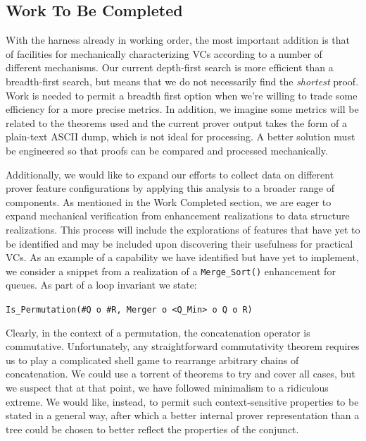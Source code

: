 \subsection{Work To Be Completed}
With the harness already in working order, the most important addition is that of facilities for mechanically characterizing VCs according to a number of different mechanisms.  Our current depth-first search is more efficient than a breadth-first search, but means that we do not necessarily find the \emph{shortest} proof.  Work is needed to permit a breadth first option when we're willing to trade some efficiency for a more precise metrics.  In addition, we imagine some metrics will be related to the theorems used and the current prover output takes the form of a plain-text ASCII dump, which is not ideal for processing.  A better solution must be engineered so that proofs can be compared and processed mechanically.

Additionally, we would like to expand our efforts to collect data on different prover feature configurations by applying this analysis to a broader range of components.  As mentioned in the Work Completed section, we are eager to expand mechanical verification from enhancement realizations to data structure realizations.  This process will include the explorations of features that have yet to be identified and may be included upon discovering their usefulness for practical VCs.  As an example of a capability we have identified but have yet to implement, we consider a snippet from a realization of a \texttt{Merge\_Sort()} enhancement for queues.  As part of a loop invariant we state:

\texttt{Is\_Permutation(\#Q o \#R, Merger o <Q\_Min> o Q o R)}

Clearly, in the context of a permutation, the concatenation operator is commutative.  Unfortunately, any straightforward commutativity theorem requires us to play a complicated shell game to rearrange arbitrary chains of concatenation.  We could use a torrent of theorems to try and cover all cases, but we suspect that at that point, we have followed minimalism to a ridiculous extreme.  We would like, instead, to permit such context-sensitive properties to be stated in a general way, after which a better internal prover representation than a tree could be chosen to better reflect the properties of the conjunct.

